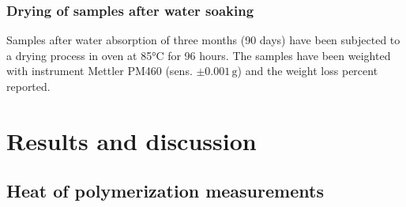 \documentclass[a4paper, 11pt]{article}
\begin{document}
\subsubsection{Drying of samples after water soaking}

Samples after water absorption of three months (90 days) have been subjected to a drying process in oven at 85°C for 96 hours. The samples have been weighted with instrument Mettler PM460 (sens. $\pm 0.001\,\text{g}$) and the weight loss percent reported. 

\newpage
\section{Results and discussion}

\subsection{Heat of polymerization measurements}
\end{document}
